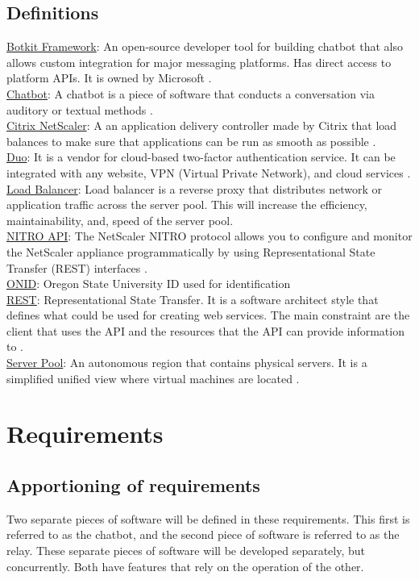 \documentclass[onecolumn, draftclsnofoot,10pt, compsoc]{IEEEtran}
\begin{document}
\subsection{Definitions}
\underline{Botkit Framework}: An open-source developer tool for building chatbot that also allows custom integration for major messaging platforms. Has direct access to platform APIs. It is owned by Microsoft \cite{framework}.
\\\underline{Chatbot}: A chatbot is a piece of software that conducts a conversation via auditory or textual methods \cite{chatbot}.
\\\underline{Citrix NetScaler}: A an application delivery controller made by Citrix that load balances to make sure that applications can be run as smooth as possible \cite{netscaler}.
\\\underline{Duo}: It is a vendor for cloud-based two-factor authentication service. It can be integrated with any website, VPN (Virtual Private Network), and cloud services \cite{duo}.
\\\underline{Load Balancer}: Load balancer is a reverse proxy that distributes network or application traffic across the server pool. This will increase the efficiency, maintainability, and, speed of the server pool. 
\\\underline{NITRO API}: The NetScaler NITRO protocol allows you to configure and monitor the NetScaler appliance programmatically by using Representational State Transfer (REST) interfaces \cite{citrixnitro}.
\\\underline{ONID}: Oregon State University ID used for identification
\\\underline{REST}: Representational State Transfer. It is a software architect style that defines what could be used for creating web services. The main constraint are the client that uses the API and the resources that the API can provide information to \cite{restphd} \cite{rest}.  
\\\underline{Server Pool}: An autonomous region that contains physical servers. It is a simplified unified view where virtual machines are located \cite{pools}.

\section{Requirements}
\subsection{Apportioning of requirements}
Two separate pieces of software will be defined in these requirements.
This first is referred to as the chatbot, and the second piece of software is referred to as the relay.
These separate pieces of software will be developed separately, but concurrently.
Both have features that rely on the operation of the other.
\end{document}
